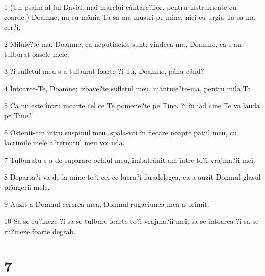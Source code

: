 \par 1 (Un psalm al lui David; mai-marelui cântare?ilor, pentru instrumente cu coarde.) Doamne, nu cu mânia Ta sa ma mustri pe mine, nici cu urgia Ta sa ma cer?i.
\par 2 Miluie?te-ma, Doamne, ca neputincios sunt; vindeca-ma, Doamne, ca s-au tulburat oasele mele;
\par 3 ?i sufletul meu s-a tulburat foarte ?i Tu, Doamne, pâna când?
\par 4 Întoarce-Te, Doamne; izbave?te sufletul meu, mântuie?te-ma, pentru mila Ta.
\par 5 Ca nu este întru moarte cel ce Te pomene?te pe Tine. ?i în iad cine Te va lauda pe Tine?
\par 6 Ostenit-am întru suspinul meu, spala-voi în fiecare noapte patul meu, cu lacrimile mele a?ternutul meu voi uda.
\par 7 Tulburatu-s-a de suparare ochiul meu, îmbatrânit-am între to?i vrajma?ii mei.
\par 8 Departa?i-va de la mine to?i cei ce lucra?i faradelegea, ca a auzit Domnul glasul plângerii mele.
\par 9 Auzit-a Domnul cererea mea, Domnul rugaciunea mea a primit.
\par 10 Sa se ru?ineze ?i sa se tulbure foarte to?i vrajma?ii mei; sa se întoarca ?i sa se ru?ineze foarte degrab.

\chapter{7}

